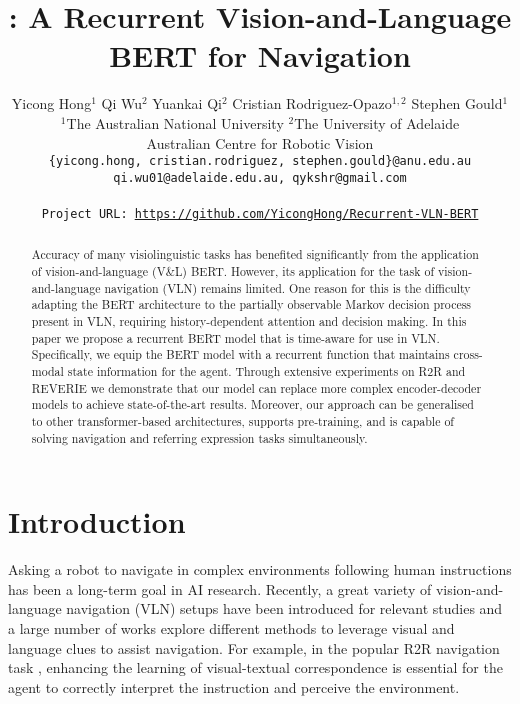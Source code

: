 \documentclass[final]{cvpr}
\begin{document}
\title{\vlnbert: A Recurrent Vision-and-Language BERT for Navigation}

\author{
Yicong Hong$^1$ \quad Qi Wu$^2$ \quad Yuankai Qi$^2$ \quad Cristian Rodriguez-Opazo$^{1,2}$ \quad Stephen Gould$^1$\\
$^1$The Australian National University \quad $^2$The University of Adelaide\\
Australian Centre for Robotic Vision\\
{\tt\small \{yicong.hong, cristian.rodriguez, stephen.gould\}@anu.edu.au} \\
{\tt\small qi.wu01@adelaide.edu.au, qykshr@gmail.com} \\ \\
{\tt\small Project URL: \href{https://github.com/YicongHong/Recurrent-VLN-BERT}{https://github.com/YicongHong/Recurrent-VLN-BERT}}
}

\maketitle



\begin{abstract}
Accuracy of many visiolinguistic tasks has benefited significantly from the application of vision-and-language (V\&L) BERT. However, its application for the task of vision-and-language navigation (VLN) remains limited. One reason for this is the difficulty adapting the BERT architecture to the partially observable Markov decision process present in VLN, requiring history-dependent attention and decision making. In this paper we propose a recurrent BERT model that is time-aware for use in VLN. Specifically, we equip the BERT model with a recurrent function that maintains cross-modal state information for the agent. Through extensive experiments on R2R and REVERIE we demonstrate that our model can replace more complex encoder-decoder models to achieve state-of-the-art results. Moreover, our approach can be generalised to other transformer-based architectures, supports pre-training, and is capable of solving navigation and referring expression tasks simultaneously.
\end{abstract}



\section{Introduction}
\label{sec:introduction}

Asking a robot to navigate in complex environments following human instructions has been a long-term goal in AI research. Recently, a great variety of vision-and-language navigation (VLN) setups \cite{anderson2018vision, qi2020reverie, thomason2020vision} have been introduced for relevant studies and a large number of works explore different methods to leverage visual and language clues to assist navigation. For example, in the popular R2R navigation task \cite{anderson2018vision}, enhancing the learning of visual-textual correspondence is essential for the agent to correctly interpret the instruction and perceive the environment.
\end{document}
